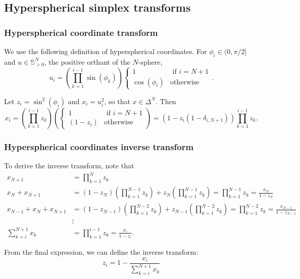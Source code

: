 \begin{appendices}
\subsection{Hyperspherical simplex transforms}

\subsubsection{Hyperspherical coordinate transform}

We use the following definition of hyperspherical coordinates.
For $\phi_i \in (0, \pi/2]$ and $u \in \mathbb{S}^N_{>0}$, the positive orthant of the $N$-sphere,
\[
  u_i = \left(\prod_{k=1}^{i-1} \sin(\phi_k)\right) \begin{cases}
    1 & \text{ if } i = N + 1\\
    \cos(\phi_i) & \text{otherwise}
  \end{cases}.
\]

Let $z_i = \sin^2(\phi_i)$ and $x_i = u_i^2$, so that $x \in \Delta^N$.
Then
\[
  x_i = \left(\prod_{k=1}^{i-1} z_k\right) \left(\begin{cases}
    1 & \text{ if } i = N + 1\\
    (1 - z_i) & \text{otherwise}
  \end{cases}\right) = (1 - z_i (1 - \delta_{i,N+1})) \prod_{k=1}^{i-1} z_k.
\]

\subsubsection{Hyperspherical coordinates inverse transform}

To derive the inverse transform, note that
\[
    \begin{aligned}
        x_{N+1} &= \prod_{k=1}^{N} z_k\\
        x_N + x_{N+1} &= (1 - z_N)\left(\prod_{k=1}^{N-1} z_k\right) + z_N \left( \prod_{k=1}^{N-1} z_k \right) = \prod_{k=1}^{N-1} z_k = \frac{x_N}{1 - z_N}\\
        x_{N-1} + x_{N} + x_{N+1} &= (1-z_{N-1}) \left(\prod_{k=1}^{N-2} z_k\right) + z_{N-1} \left(\prod_{k=1}^{N-2} z_k\right) = \prod_{k=1}^{N-2} z_k = \frac{x_{N-1}}{1 - z_{N-1}}\\
        &\vdots \\
        \sum_{k=i}^{N+1} x_{k} &= \prod_{k=1}^{i - 1} z_k = \frac{x_i}{1 - z_i}.
    \end{aligned}
\]

From the final expression, we can define the inverse transform:
\[
z_i = 1 - \frac{x_i}{\sum_{k=i}^{N+1} x_k}
\]


\end{appendices}
